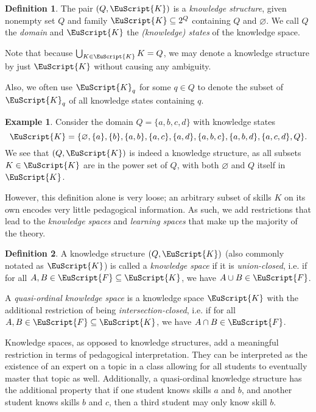 \documentclass[11pt,letterpaper,dvipsnames]{article}
\theoremstyle{definition}
\newtheorem{definition}{Definition}[section]
\newtheorem{example}{Example}[section]
\newcommand{\es}[1]{\EuScript{#1}}
\begin{document}
\begin{definition}
    The pair $(Q,\EuScript{K})$ is a \textit{knowledge structure}, given nonempty set $Q$ and family $\EuScript{K}\subseteq 2^Q$ containing $Q$ and $\varnothing$. We call $Q$ the \textit{domain} and $\EuScript{K}$ the \textit{(knowledge) states} of the knowledge space.
\end{definition}

Note that because $\bigcup_{K\in\EuScript{K}}K=Q$, we may denote a knowledge structure by just $\EuScript{K}$ without causing any ambiguity.

Also, we often use $\es{K}_q$ for some $q\in Q$ to denote the subset of $\es{K}_q$ of all knowledge states containing $q$.

\begin{example}
    Consider the domain $Q=\{a,b,c,d\}$ with knowledge states
    \[
        \EuScript{K} = \{\varnothing,\{a\},\{b\},\{a,b\},\{a,c\},\{a,d\},\{a,b,c\},\{a,b,d\},\{a,c,d\},Q\}.
    \]
    We see that $(Q,\EuScript{K})$ is indeed a knowledge structure, as all subsets $K\in\EuScript{K}$ are in the power set of $Q$, with both $\varnothing$ and $Q$ itself in $\EuScript{K}$.
\end{example}

However, this definition alone is very loose; an arbitrary subset of skills $K$ on its own encodes very little pedagogical information. As such, we add restrictions that lead to the \textit{knowledge spaces} and \textit{learning spaces} that make up the majority of the theory.

\begin{definition}
    A knowledge structure $(Q, \es{K})$ (also commonly notated as $\es{K}$) is called a \textit{knowledge space} if it is \textit{union-closed}, i.e. if for all $A,B\in\es{F} \subseteq \es{K}$, we have $A\cup B \in \es{F}$.

    A \textit{quasi-ordinal knowledge space} is a knowledge space $\es{K}$ with the additional restriction of being \textit{intersection-closed}, i.e. if for all $A,B\in\es{F} \subseteq \es{K}$, we have $A\cap B \in \es{F}$.
\end{definition}


Knowledge spaces, as opposed to knowledge structures, add a meaningful restriction in terms of pedagogical interpretation. They can be interpreted as the existence of an expert on a topic in a class allowing for all students to eventually master that topic as well. Additionally, a quasi-ordinal knowledge structure has the additional property that if one student knows skills $a$ and $b$, and another student knows skills $b$ and $c$, then a third student may only know skill $b$.
\end{document}
